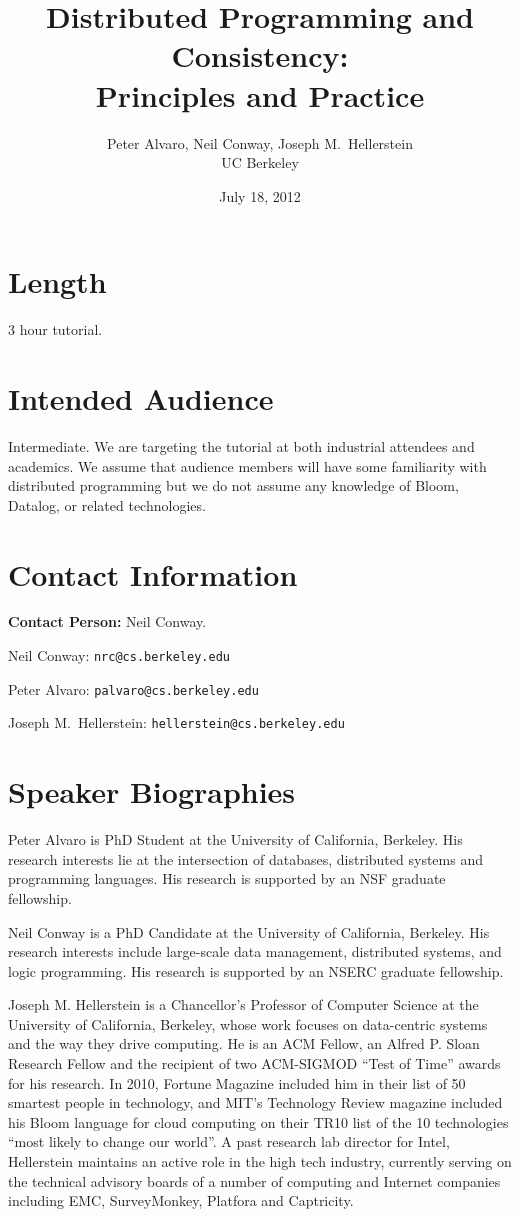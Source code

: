 \documentclass[11pt]{article}
\title{Distributed Programming and Consistency:\\Principles and Practice}
\author{Peter Alvaro, Neil Conway, Joseph M.\ Hellerstein\\UC Berkeley}
\date{July 18, 2012}
\begin{document}
\maketitle

\section*{Length}

3 hour tutorial.

\section*{Intended Audience}

Intermediate. We are targeting the tutorial at both industrial attendees and
academics. We assume that audience members will have some familiarity with
distributed programming but we do not assume any knowledge of Bloom, Datalog, or
related technologies.

\section*{Contact Information}

\textbf{Contact Person:} Neil Conway.

\bigskip

\noindent{}Neil Conway: \texttt{nrc@cs.berkeley.edu}

\noindent{}Peter Alvaro: \texttt{palvaro@cs.berkeley.edu}

\noindent{}Joseph M.\ Hellerstein: \texttt{hellerstein@cs.berkeley.edu}

\section*{Speaker Biographies}

Peter Alvaro is PhD Student at the University of California, Berkeley. His
research interests lie at the intersection of databases, distributed systems and
programming languages. His research is supported by an NSF graduate fellowship.

Neil Conway is a PhD Candidate at the University of California, Berkeley. His
research interests include large-scale data management, distributed systems,
and logic programming. His research is supported by an NSERC graduate
fellowship.

Joseph M. Hellerstein is a Chancellor's Professor of Computer Science at the
University of California, Berkeley, whose work focuses on data-centric systems
and the way they drive computing. He is an ACM Fellow, an Alfred P. Sloan
Research Fellow and the recipient of two ACM-SIGMOD ``Test of Time'' awards for
his research. In 2010, Fortune Magazine included him in their list of 50
smartest people in technology, and MIT's Technology Review magazine included his
Bloom language for cloud computing on their TR10 list of the 10 technologies
``most likely to change our world''. A past research lab director for Intel,
Hellerstein maintains an active role in the high tech industry, currently
serving on the technical advisory boards of a number of computing and Internet
companies including EMC, SurveyMonkey, Platfora and Captricity.
\end{document}
